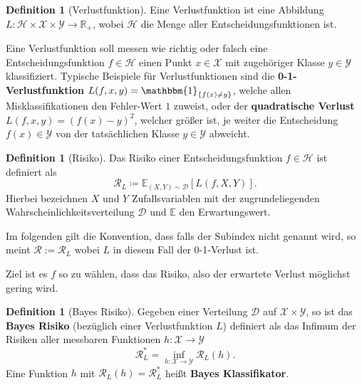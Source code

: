 \documentclass{article}
\theoremstyle{plain}
\theoremstyle{definition}
\newtheorem{dfn}[thm]{Definition}
\begin{document}
    \begin{dfn}[Verlustfunktion]
        Eine Verlustfunktion ist eine Abbildung \mbox{$L: \mathcal{H} \times \mathcal{X} \times \mathcal{Y} \to \mathbb{R}_{+}$}, wobei $\mathcal{H}$ die Menge aller Entscheidungsfunktionen ist.
    \end{dfn}

    Eine Verlustfunktion soll messen wie richtig oder falsch eine Entscheidungsfunktion $f \in \mathcal{H}$ einen Punkt $x \in \mathcal{X}$ mit zugehöriger Klasse $y \in \mathcal{Y}$ klassifiziert.
    Typische Beispiele für Verlustfunktionen sind die \textbf{0-1-Verlustfunktion} $L(f,x,y) = \mathbbm{1}_{\{f(x) \neq y\}}$, welche allen Misklassifikationen den Fehler-Wert $1$ zuweist, oder der \textbf{quadratische Verlust} $L(f,x,y)=(f(x)-y)^2$, welcher größer ist, je weiter die Entscheidung $f(x) \in \mathcal{Y}$ von der tatsächlichen Klasse $y \in \mathcal{Y}$ abweicht.

    \begin{dfn}[Risiko]
        Das Risiko einer Entscheidungsfunktion $f \in \mathcal{H}$ ist definiert als 
        \begin{equation*}
            \mathcal{R}_{L} \coloneqq \mathbb{E}_{(X,Y)\sim \mathcal{D}}[L(f,X,Y)].
        \end{equation*}
        Hierbei bezeichnen $X$ und $Y$ Zufallsvariablen mit der zugrundeliegenden Wahrscheinlichkeitsverteilung $\mathcal{D}$ und $\mathbb{E}$ den Erwartungswert.
    \end{dfn}
    
    Im folgenden gilt die Konvention, dass falls der Subindex nicht genannt wird, so meint $\mathcal{R} := \mathcal{R}_{L}$
    wobei $L$ in diesem Fall der 0-1-Verlust ist.
    
    \vspace{5mm}
    
    Ziel ist es $f$ so zu wählen, dass das Risiko, also der erwartete Verlust möglichst gering wird. 
    
    \begin{dfn}[Bayes Risiko] \label{dfn:bayes_risk}
        Gegeben einer Verteilung $\mathcal{D}$ auf $\mathcal{X} \times \mathcal{Y}$, so ist das \textbf{Bayes Risiko} (bezüglich einer Verlustfunktion $L$) definiert als das Infimum der Risiken aller messbaren Funktionen $h: \mathcal{X} \to \mathcal{Y}$
        \[
            \mathcal{R}_{L}^{*} = \inf_{h: \mathcal{X} \to \mathcal{Y}} \mathcal{R}_{L}(h).
        \]
        Eine Funktion $h$ mit $\mathcal{R}_{L}(h) = \mathcal{R}_{L}^{*}$ heißt \textbf{Bayes Klassifikator}.
    \end{dfn}
    
\end{document}
